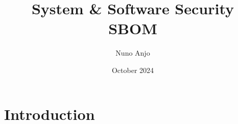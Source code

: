 \documentclass{article}
\title{System \& Software Security \\ SBOM}
\author{Nuno Anjo}
\date{October 2024}
\begin{document}
\maketitle

\section{Introduction}
\end{document}
